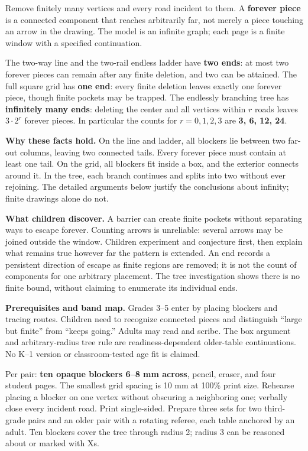 \documentclass[11pt,letterpaper]{article}
\newcommand{\heading}[1]{\par\vspace{5pt}{\large\bfseries #1}\par}
\begin{document}
\heading{Mathematical destination}
Remove finitely many vertices and every road incident to them. A \textbf{forever piece} is a connected component that reaches arbitrarily far, not merely a piece touching an arrow in the drawing. The model is an infinite graph; each page is a finite window with a specified continuation.

The two-way line and the two-rail endless ladder have \textbf{two ends}: at most two forever pieces can remain after any finite deletion, and two can be attained. The full square grid has \textbf{one end}: every finite deletion leaves exactly one forever piece, though finite pockets may be trapped. The endlessly branching tree has \textbf{infinitely many ends}: deleting the center and all vertices within $r$ roads leaves $3\cdot2^r$ forever pieces. In particular the counts for $r=0,1,2,3$ are \textbf{3, 6, 12, 24}.

\textbf{Why these facts hold.} On the line and ladder, all blockers lie between two far-out columns, leaving two connected tails. Every forever piece must contain at least one tail. On the grid, all blockers fit inside a box, and the exterior connects around it. In the tree, each branch continues and splits into two without ever rejoining. The detailed arguments below justify the conclusions about infinity; finite drawings alone do not.

\textbf{What children discover.} A barrier can create finite pockets without separating ways to escape forever. Counting arrows is unreliable: several arrows may be joined outside the window. Children experiment and conjecture first, then explain what remains true however far the pattern is extended. An end records a persistent direction of escape as finite regions are removed; it is not the count of components for one arbitrary placement. The tree investigation shows there is no finite bound, without claiming to enumerate its individual ends.

\textbf{Prerequisites and band map.} Grades 3--5 enter by placing blockers and tracing routes. Children need to recognize connected pieces and distinguish ``large but finite'' from ``keeps going.'' Adults may read and scribe. The box argument and arbitrary-radius tree rule are readiness-dependent older-table continuations. No K--1 version or classroom-tested age fit is claimed.

\heading{Preparation and common launch}
Per pair: \textbf{ten opaque blockers 6--8 mm across}, pencil, eraser, and four student pages. The smallest grid spacing is 10 mm at 100\% print size. Rehearse placing a blocker on one vertex without obscuring a neighboring one; verbally close every incident road. Print single-sided. Prepare three sets for two third-grade pairs and an older pair with a rotating referee, each table anchored by an adult. Ten blockers cover the tree through radius 2; radius 3 can be reasoned about or marked with Xs.
\end{document}
